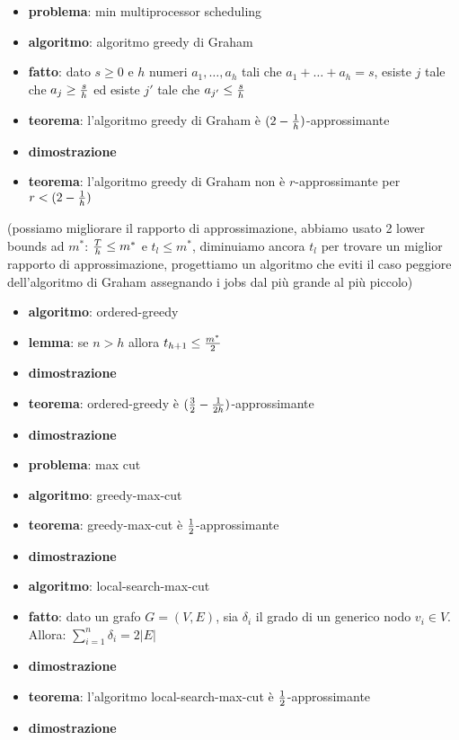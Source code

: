     \begin{itemize}

\item
  \textbf{problema}: min multiprocessor scheduling
\item
  \textbf{algoritmo}: algoritmo greedy di Graham
\item
  \textbf{fatto}: dato \(s \geq 0\) e \(h\) numeri \(a_1, \dots, a_h\)
  tali che \(a_1 + \dots + a_h = s\), esiste \(j\) tale che
  \(a_j \geq {s \over h}\) ed esiste \(j'\) tale che
  \(a_{j'} \leq {s \over h}\)
\item
  \textbf{teorema}: l'algoritmo greedy di Graham è
  \((2 - {1 \over h})\)-approssimante
\item
  \textbf{dimostrazione}
\item
  \textbf{teorema}: l'algoritmo greedy di Graham non è
  \(r\)-approssimante per \(r < (2 - {1 \over h})\)
\end{itemize}

(possiamo migliorare il rapporto di approssimazione, abbiamo usato 2
lower bounds ad \(m^*\): \({T \over h} \leq m^*\) e \(t_l \leq m^*\),
diminuiamo ancora \(t_l\) per trovare un miglior rapporto di
approssimazione, progettiamo un algoritmo che eviti il caso peggiore
dell'algoritmo di Graham assegnando i jobs dal più grande al più
piccolo)

\begin{itemize}

\item
  \textbf{algoritmo}: ordered-greedy
\item
  \textbf{lemma}: se \(n > h\) allora \(t_{h+1} \leq {m^* \over 2}\)
\item
  \textbf{dimostrazione}
\item
  \textbf{teorema}: ordered-greedy è
  \(({3 \over 2} - {1 \over 2h})\)-approssimante
\item
  \textbf{dimostrazione}
\end{itemize}

    \begin{itemize}

\item
  \textbf{problema}: max cut
\item
  \textbf{algoritmo}: greedy-max-cut
\item
  \textbf{teorema}: greedy-max-cut è \({1 \over 2}\)-approssimante
\item
  \textbf{dimostrazione}
\end{itemize}

    \begin{itemize}

\item
  \textbf{algoritmo}: local-search-max-cut
\item
  \textbf{fatto}: dato un grafo \(G=(V,E)\), sia \(\delta_i\) il grado
  di un generico nodo \(v_i \in V\). Allora:
  \(\sum_{i=1}^{n} \delta_i = 2 |E|\)
\item
  \textbf{dimostrazione}
\item
  \textbf{teorema}: l'algoritmo local-search-max-cut è
  \({1 \over 2}\)-approssimante
\item
  \textbf{dimostrazione}
\end{itemize}

